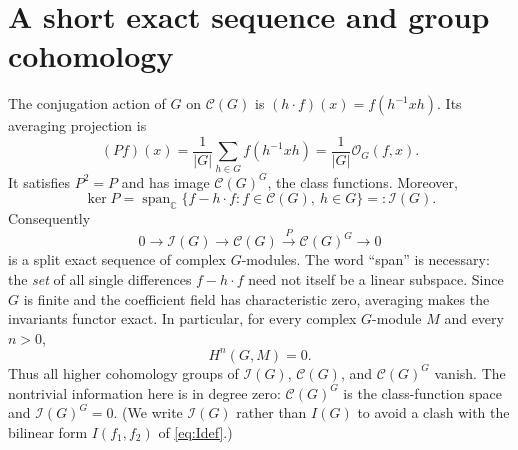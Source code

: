 \documentclass[12pt]{article}
\theoremstyle{remark}
\newcommand{\C}{\mathbb C}
\newcommand{\cG}{\mathcal C(G)}
\newcommand{\Orb}{\mathcal O}
\begin{document}
\appendix
\section{A short exact sequence and group cohomology}
The conjugation action of $G$ on $\cG$ is
$(h\cdot f)(x)=f(h^{-1}xh)$. Its averaging projection is
\[
 (Pf)(x)=\frac1{|G|}\sum_{h\in G}f(h^{-1}xh)
        =\frac1{|G|}\Orb_G(f,x).
\]
It satisfies $P^2=P$ and has image $\cG^G$, the class functions.
Moreover,
\[
 \ker P=\operatorname{span}_\C
 \{f-h\cdot f:f\in\cG,\ h\in G\}=:\mathcal I(G).
\]
Consequently
\[
 0\longrightarrow \mathcal I(G)\longrightarrow\cG
   \overset P\longrightarrow\cG^G\longrightarrow0
\]
is a split exact sequence of complex $G$-modules.  The word
``span'' is necessary: the \emph{set} of all single differences
$f-h\cdot f$ need not itself be a linear subspace.
Since $G$ is finite and the coefficient field has characteristic
zero, averaging makes the invariants functor exact. In particular,
for every complex $G$-module $M$ and every $n>0$,
\[
 H^n(G,M)=0.
\]
Thus all higher cohomology groups of $\mathcal I(G)$, $\cG$, and
$\cG^G$ vanish. The nontrivial information here is in degree zero:
$\cG^G$ is the class-function space and $\mathcal I(G)^G=0$.
(We write $\mathcal I(G)$ rather than $I(G)$ to avoid a clash with the
bilinear form $I(f_1,f_2)$ of \eqref{eq:Idef}.)
\end{document}
